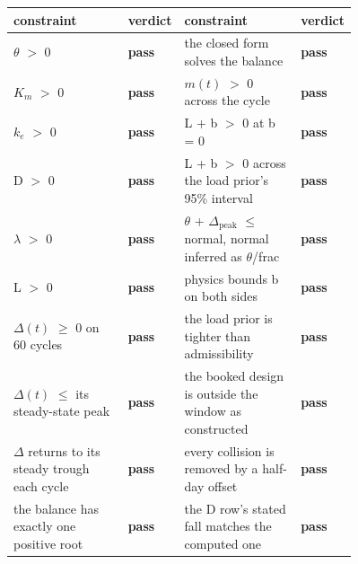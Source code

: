 \begin{tabular}{@{}>{\raggedright\arraybackslash}p{0.38\linewidth}l >{\raggedright\arraybackslash}p{0.38\linewidth}l@{}}
\toprule
\textbf{constraint} & \textbf{verdict} & \textbf{constraint} & \textbf{verdict} \\
\midrule
$\theta$ $>$ 0 & \textbf{pass} & the closed form solves the balance & \textbf{pass} \\
$K_m$ $>$ 0 & \textbf{pass} & $m(t)$ $>$ 0 across the cycle & \textbf{pass} \\
$k_e$ $>$ 0 & \textbf{pass} & L + b $>$ 0 at b = 0 & \textbf{pass} \\
D $>$ 0 & \textbf{pass} & L + b $>$ 0 across the load prior's 95\% interval & \textbf{pass} \\
$\lambda$ $>$ 0 & \textbf{pass} & $\theta$ + $\Delta_{\mathrm{peak}}$ $\le$ normal, normal inferred as $\theta$/frac & \textbf{pass} \\
L $>$ 0 & \textbf{pass} & physics bounds b on both sides & \textbf{pass} \\
$\Delta(t)$ $\ge$ 0 on 60 cycles & \textbf{pass} & the load prior is tighter than admissibility & \textbf{pass} \\
$\Delta(t)$ $\le$ its steady-state peak & \textbf{pass} & the booked design is outside the window as constructed & \textbf{pass} \\
$\Delta$ returns to its steady trough each cycle & \textbf{pass} & every collision is removed by a half-day offset & \textbf{pass} \\
the balance has exactly one positive root & \textbf{pass} & the D row's stated fall matches the computed one & \textbf{pass} \\
\bottomrule
\end{tabular}
